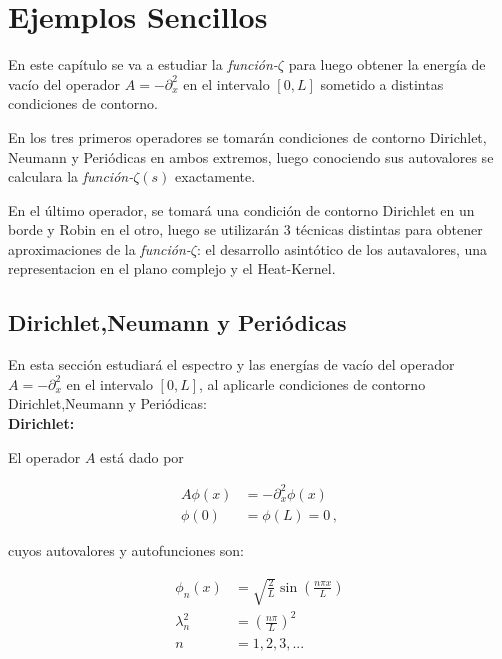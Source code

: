 \chapter{Ejemplos Sencillos}

En este capítulo se va a estudiar la {\it función-$\zeta$} para luego obtener la energía de vacío del operador $A = - \partial ^2 _x$ en el intervalo $[0,L]$ sometido a distintas condiciones de contorno. 

En los tres primeros operadores se tomarán condiciones de contorno Dirichlet, Neumann y Periódicas en ambos extremos, luego conociendo sus autovalores  se calculara la {\it función-$\zeta  (s)$} exactamente. 

En el último operador, se tomará una condición de contorno Dirichlet en un borde y Robin en el otro, luego se utilizarán 3 técnicas distintas para obtener aproximaciones de la {\it función-$\zeta$}: el desarrollo asintótico de los autavalores, una representacion en el plano complejo  y el Heat-Kernel.

\section{Dirichlet,Neumann y Periódicas}

En esta sección estudiará el espectro y las energías de vacío del operador $A = - \partial ^2 _x$ en el intervalo $[0,L]$, al aplicarle condiciones de contorno Dirichlet,Neumann y Periódicas:\\

\textbf{Dirichlet:}


El operador $A$ está dado por

\begin{equation}
\begin{aligned}
	A \phi (x) &= - \partial _x ^2 \phi (x) \\[10pt]
    \phi (0) &= \phi(L) = 0 
    \, ,
\end{aligned}
\end{equation}



cuyos autovalores y autofunciones son: 

\begin{equation}
\begin{aligned}
	\phi _n (x) &= \sqrt{\frac{2}{L}} \sin( \frac{n \pi x}{L} ) \\[10pt]
	\lambda _n ^2 &= \left( \frac{n \pi }{L} \right) ^2 \\[10pt]
	n &= 1,2,3, ...
\end{aligned}
\end{equation}

